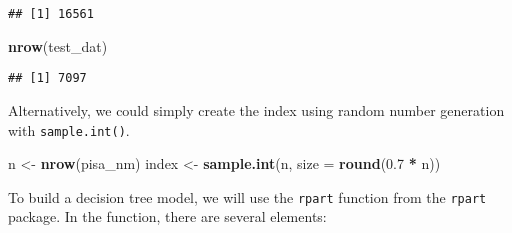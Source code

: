 \documentclass[]{book}
\newenvironment{Shaded}{\begin{snugshade}}{\end{snugshade}}
\newcommand{\CommentTok}[1]{\textcolor[rgb]{0.56,0.35,0.01}{\textit{#1}}}
\newcommand{\DataTypeTok}[1]{\textcolor[rgb]{0.13,0.29,0.53}{#1}}
\newcommand{\DecValTok}[1]{\textcolor[rgb]{0.00,0.00,0.81}{#1}}
\newcommand{\FloatTok}[1]{\textcolor[rgb]{0.00,0.00,0.81}{#1}}
\newcommand{\KeywordTok}[1]{\textcolor[rgb]{0.13,0.29,0.53}{\textbf{#1}}}
\newcommand{\NormalTok}[1]{#1}
\newcommand{\OperatorTok}[1]{\textcolor[rgb]{0.81,0.36,0.00}{\textbf{#1}}}
\newcommand{\OtherTok}[1]{\textcolor[rgb]{0.56,0.35,0.01}{#1}}
\newcommand{\StringTok}[1]{\textcolor[rgb]{0.31,0.60,0.02}{#1}}
\begin{document}
\begin{Shaded}
\end{Shaded}

\begin{verbatim}
## [1] 16561
\end{verbatim}

\begin{Shaded}
\begin{Highlighting}[]
\KeywordTok{nrow}\NormalTok{(test_dat)}
\end{Highlighting}
\end{Shaded}

\begin{verbatim}
## [1] 7097
\end{verbatim}

Alternatively, we could simply create the index using random number generation with \texttt{sample.int()}.

\begin{Shaded}
\begin{Highlighting}[]
\NormalTok{n <-}\StringTok{ }\KeywordTok{nrow}\NormalTok{(pisa_nm)}
\NormalTok{index <-}\StringTok{ }\KeywordTok{sample.int}\NormalTok{(n, }\DataTypeTok{size =} \KeywordTok{round}\NormalTok{(}\FloatTok{0.7} \OperatorTok{*}\StringTok{ }\NormalTok{n))}
\end{Highlighting}
\end{Shaded}

To build a decision tree model, we will use the \texttt{rpart} function from the \texttt{rpart} package. In the function, there are several elements:
\end{document}
